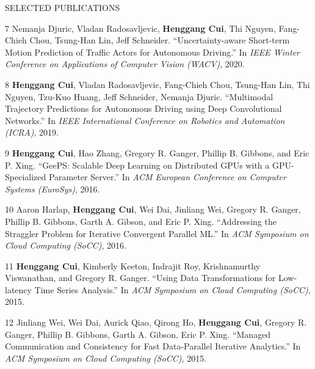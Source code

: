\documentclass{resume} %
\begin{document}
\begin{rSection}{SELECTED PUBLICATIONS}
{    \item
    [7]
        Nemanja Djuric, Vladan Radosavljevic, {\bf Henggang Cui}, Thi Nguyen, Fang-Chieh Chou, Tsung-Han Lin, Jeff Schneider.
        ``Uncertainty-aware Short-term Motion Prediction of Traffic Actors for Autonomous Driving.''
        In \emph{IEEE Winter Conference on Applications of Computer Vision (WACV)}, 2020.
    \item
    [8]
        {\bf Henggang Cui}, Vladan Radosavljevic, Fang-Chieh Chou, Tsung-Han Lin, Thi Nguyen, Tzu-Kuo Huang, Jeff Schneider, Nemanja Djuric.
        ``Multimodal Trajectory Predictions for Autonomous Driving using Deep Convolutional Networks.''
        In \emph{IEEE International Conference on Robotics and Automation (ICRA)}, 2019.
    \item
    [9]
        {\bf Henggang Cui}, Hao Zhang, Gregory R. Ganger, Phillip B. Gibbons, and Eric P. Xing.
        ``GeePS: Scalable Deep Learning on Distributed GPUs with a GPU-Specialized Parameter Server.''
        In \emph{ACM European Conference on Computer Systems (EuroSys)}, 2016.
    \item
    [10]
        Aaron Harlap, {\bf Henggang Cui}, Wei Dai, Jinliang Wei, Gregory R. Ganger, Phillip B. Gibbons, Garth A. Gibson, and Eric P. Xing.
        ``Addressing the Straggler Problem for Iterative Convergent Parallel ML.''
        In \emph{ACM Symposium on Cloud Computing (SoCC)}, 2016.
    \item
    [11]
        {\bf Henggang Cui}, Kimberly Keeton, Indrajit Roy, Krishnamurthy Viswanathan, and Gregory R. Ganger.
        ``Using Data Transformations for Low-latency Time Series Analysis.''
        In \emph{ACM Symposium on Cloud Computing (SoCC)}, 2015.
    \item
    [12]
        Jinliang Wei, Wei Dai, Aurick Qiao, Qirong Ho, {\bf Henggang Cui}, Gregory R. Ganger, Phillip B. Gibbons, Garth A. Gibson, Eric P. Xing.
        ``Managed Communication and Consistency for Fast Data-Parallel Iterative Analytics.''
        In \emph{ACM Symposium on Cloud Computing (SoCC)}, 2015.
    \item
}
\end{rSection}
\end{document}
